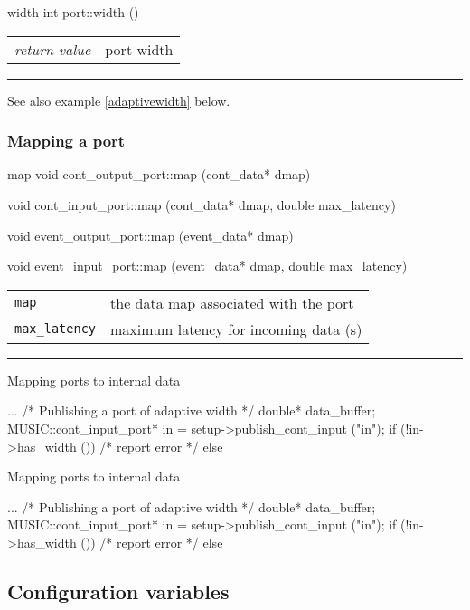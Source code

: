 \documentclass[a4paper]{report}
\makeatletter
\newenvironment{parameters}%
{\begin{tabular}{@{\hspace{2em}}lp{0.6\textwidth}}}%
{\end{tabular}\par\vspace{1mm}\par\hrule\par\vspace{5mm}}
\makeatother
\begin{document}
\begin{head}{width}
  int port::width ()
\end{head}
\begin{parameters}
  \emph{return value} & port width \\
\end{parameters}

See also example \ref{adaptivewidth} below.

\subsubsection{Mapping a port}

\begin{head}{map}
    void cont_output_port::map (cont_data* dmap)

    void cont_input_port::map (cont_data* dmap, double max_latency)

    void event_output_port::map (event_data* dmap)

    void event_input_port::map (event_data* dmap, double max_latency)
\end{head}
\begin{parameters}
  \lstinline|map| & the data map associated with the port \\
  \lstinline|max_latency| & maximum latency for incoming data (s)
  \\
\end{parameters}

\begin{code}{Mapping ports to internal data}
  {
    ...
    /* Publishing a port of adaptive width */
    double* data_buffer;
    MUSIC::cont_input_port* in = setup->publish_cont_input ("in");
    if (!in->has_width ())
      /* report error */
    else
      {
        
      }
  }
\end{code}

\begin{code}{Mapping ports to internal data\label{adaptivewidth}}
  {
    ...
    /* Publishing a port of adaptive width */
    double* data_buffer;
    MUSIC::cont_input_port* in = setup->publish_cont_input ("in");
    if (!in->has_width ())
      /* report error */
    else
      {
        
      }
  }
\end{code}

\subsection{Configuration variables}
\end{document}
